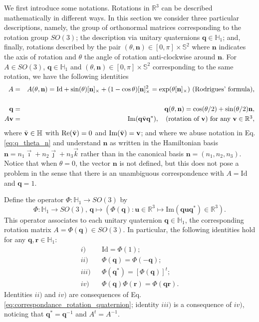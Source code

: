 \documentclass[12pt]{article}
\def\R{\mathbb{R}}
\def\to{\rightarrow}
\newcommand{\beqarl}{\begin{eqnarray}}
\newcommand{\eeqarl}{\end{eqnarray}}
\newcommand{\be}{\begin{equation}}
\newcommand{\ee}{\end{equation}}
\newcommand{\nvec}{\mathbf{n}}
\newcommand{\uu}{\mathbf{u}}
\newcommand{\Id}{\mathrm{Id}}
\newcommand{\unitq}{{\mathbb{H}_1}}
\newcommand{\Ima}{\mbox{Im}}
\newcommand{\Real}{\mbox{Re}}
\newcommand{\q}{\mathbf{q}}
\begin{document}
\medskip
  We first introduce some notations.
Rotations in $\mathbb{R}^3$ can be described mathematically in different ways. In this section we consider three particular descriptions, namely, the group of orthonormal matrices corresponding to the rotation group $SO(3)$; the description via unitary quaternions $\q\in \unitq$; and, finally, rotations  described by the pair $(\theta, \nvec)\in[0,\pi]\times \mathbb{S}^2$ where $\nvec$ indicates the axis of rotation and $\theta$ the angle of rotation anti-clockwise around $\nvec$. For $A\in SO(3)$, $\q \in \unitq$ and $(\theta, \nvec)\in[0,\pi]\times \mathbb{S}^2$ corresponding to the same rotation, we have the following identities
\beqarl
A &=& A(\theta,\nvec)=\Id+ \sin(\theta)[\nvec]_\times + (1-\cos\theta)[\nvec]_\times^2= \exp(\theta[\nvec]_\times) \mbox{ (Rodrigues' formula),}\nonumber\\ \label{eq:rodrigues_formula}\\
\q &=& \q(\theta,\nvec)= \cos(\theta/2)+\sin(\theta/2) \nvec, \label{eq:q_theta_n}\\
\label{eq:correspondance_rotation_quaternion}
A{\bf v} &=& \Ima(\q\bar {\bf v}\q^*), \quad \mbox{(rotation of ${\bf v}$) for any ${\bf v}\in \mathbb{R}^3$}, 
\eeqarl
where $\bar {\bf v}\in \mathbb{H}$ with $\Real(\bar {\bf v})=0$ and $\Ima(\bar {\bf v})={\bf v}$; and
where we abuse notation in Eq. \eqref{eq:q_theta_n} and understand $\nvec$  as written in the Hamiltonian basis $\nvec = n_1 \vec{\imath}+ n_2 \vec{\jmath}+n_3 \vec{k}$ rather than in the canonical basis $\nvec=(n_1, n_2, n_3)$. Notice that when $\theta=0$, the vector $\nvec$ is not defined, but this does not pose a problem in the sense that 
 there is an unambiguous correspondence with $A=\Id$ and $\q=1$.



Define the operator $\Phi: \unitq \to SO(3)$
 by
\be \label{eq:def_Phi}
\Phi: \unitq \longrightarrow SO(3), \, \q\mapsto (\Phi (\q): \uu\in\R^3\mapsto \Ima (\q \uu \q^\ast)\in\R^3).
\ee
This operator associates to each unitary quaternion $\q \in \unitq$, the corresponding rotation matrix $A= \Phi(\q) \in SO(3)$.
 In particular, the following identities hold for  any $\q, \mathbf{r} \in \unitq$:
\beqarl
 i)&& \Id = \Phi(1);\\
 ii)&&\Phi(\q)=\Phi(-\q) ;\\
 iii)&&\Phi(\q^*) = \left[\Phi(\q)\right]^t; \label{eq:transpose_matrix}\\
 iv)&& \Phi(\q)\Phi(\mathbf{r})= \Phi(\q \mathbf{r}). \label{eq:product_matrix}
\eeqarl
Identities $ii)$ and $iv)$ are consequences of Eq. \eqref{eq:correspondance_rotation_quaternion}; identity $iii)$ is a consequence of $iv)$, noticing that $\q^\ast=\q^{-1}$ and $A^t=A^{-1}$.
\end{document}
